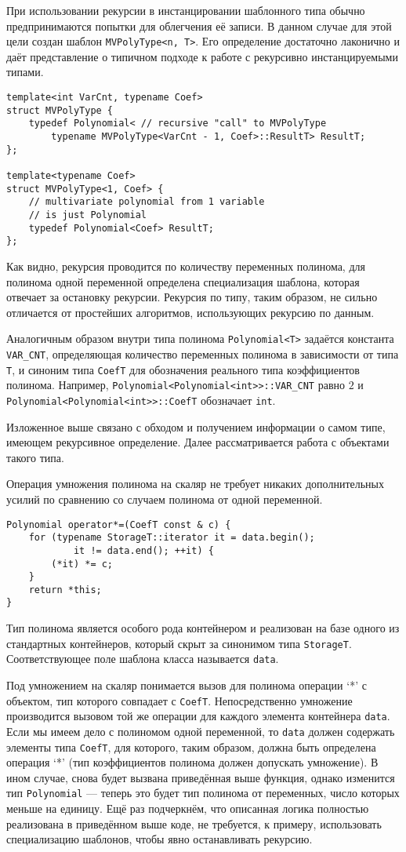 \documentclass[14pt]{extarticle}
\begin{document}
При использовании рекурсии в инстанцировании шаблонного типа обычно
предпринимаются попытки для облегчения её записи. В данном случае для этой цели
создан шаблон \lstinline$MVPolyType<n, T>$. Его определение достаточно
лаконично и даёт представление о типичном подходе к работе с
рекурсивно инстанцируемыми типами.
\begin{lstlisting}
template<int VarCnt, typename Coef>
struct MVPolyType {
    typedef Polynomial< // recursive "call" to MVPolyType
        typename MVPolyType<VarCnt - 1, Coef>::ResultT> ResultT;
};

template<typename Coef>
struct MVPolyType<1, Coef> {
    // multivariate polynomial from 1 variable
    // is just Polynomial
    typedef Polynomial<Coef> ResultT;
};
\end{lstlisting}
Как видно, рекурсия проводится по количеству переменных полинома, для полинома
одной переменной определена специализация шаблона, которая отвечает за остановку
рекурсии. Рекурсия по типу, таким образом, не сильно отличается от простейших
алгоритмов, использующих рекурсию по данным.

Аналогичным образом внутри типа полинома \lstinline$Polynomial<T>$ задаётся
константа \lstinline$VAR_CNT$, определяющая количество переменных полинома в
зависимости от типа \lstinline$T$, и синоним типа \lstinline$CoefT$ для
обозначения реального типа коэффициентов полинома. Например,
\lstinline$Polynomial<Polynomial<int>>::VAR_CNT$ равно $2$ и 
\lstinline$Polynomial<Polynomial<int>>::CoefT$ обозначает \lstinline$int$.

Изложенное выше связано с обходом и получением информации о самом типе,
имеющем рекурсивное определение. Далее рассматривается работа с объектами
такого типа.

Операция умножения полинома на скаляр не требует никаких дополнительных усилий
по сравнению со случаем полинома от одной переменной.
\begin{lstlisting}
Polynomial operator*=(CoefT const & c) {
    for (typename StorageT::iterator it = data.begin(); 
            it != data.end(); ++it) {
        (*it) *= c;
    }
    return *this;
}
\end{lstlisting}
Тип полинома является особого рода контейнером и реализован на базе одного из
стандартных контейнеров, который скрыт за синонимом типа \lstinline$StorageT$.
Соответствующее поле шаблона класса называется \lstinline$data$.

Под умножением на скаляр понимается вызов для полинома операции ‘*’ с объектом,
тип которого совпадает с \lstinline$CoefT$. Непосредственно умножение
производится вызовом той же операции для каждого элемента контейнера
\lstinline$data$. Если мы имеем дело с полиномом одной переменной, то
\lstinline$data$ должен содержать элементы типа \lstinline$CoefT$, для которого,
таким образом, должна быть определена операция ‘*’ (тип коэффициентов полинома
должен допускать умножение). В ином случае, снова будет вызвана приведённая выше
функция, однако изменится тип \lstinline$Polynomial$ — теперь это будет тип
полинома от переменных, число которых меньше на единицу. Ещё раз подчеркнём, что
описанная логика полностью реализована в приведённом выше коде, не требуется, к
примеру, использовать специализацию шаблонов, чтобы явно останавливать рекурсию.
\end{document}
